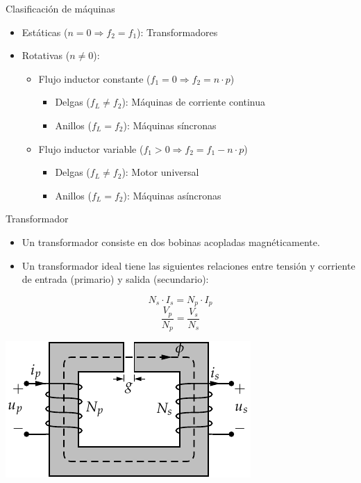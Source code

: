 \documentclass[xcolor={usenames,svgnames,dvipsnames}]{beamer}
\begin{document}
\begin{frame}[label={sec:org7cf3bb1}]{Clasificación de máquinas}
\begin{itemize}
\item Estáticas (\(n=0\Rightarrow f_{2}=f_{1}\)): Transformadores

\item Rotativas (\(n\neq0\)):

\begin{itemize}
\item Flujo inductor constante (\(f_{1}=0\Rightarrow f_{2}=n\cdot
            p\))

\begin{itemize}
\item Delgas (\(f_{L}\neq f_{2}\)): Máquinas de corriente continua

\item Anillos (\(f_{L}=f_{2}\)): Máquinas síncronas
\end{itemize}

\item Flujo inductor variable (\(f_{1}>0\Rightarrow
            f_{2}=f_{1}-n\cdot p\))

\begin{itemize}
\item Delgas (\(f_{L}\neq f_{2}\)): Motor universal

\item Anillos (\(f_{L}=f_{2}\)): Máquinas asíncronas
\end{itemize}
\end{itemize}
\end{itemize}
\end{frame}

\begin{frame}[label={sec:org6d01de5}]{Transformador}
\begin{itemize}
\item Un transformador consiste en dos bobinas acopladas magnéticamente.

\item Un transformador ideal tiene las siguientes relaciones entre tensión
y corriente de entrada (primario) y salida (secundario):
\end{itemize}

$$N_{s}\cdot I_{s}=N_{p}\cdot I_{p}$$
$$\frac{V_{p}}{N_{p}}=\frac{V_{s}}{N_{s}}$$

\begin{center}
\includegraphics[height=0.3\textheight]{../figs/Transformador2.pdf}
\end{center}
\end{frame}
\end{document}
